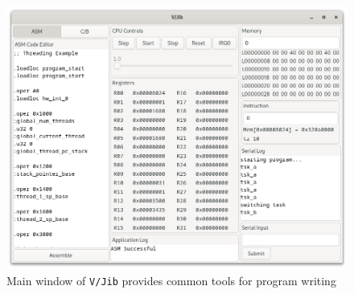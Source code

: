 \documentclass{article}
\begin{document}
\begin{figure}[h!]
    \centering
    \includegraphics[width=5in]{images/visual-jib.png}
    \caption{Main window of \texttt{V/Jib} provides common tools for program writing}
    \label{fig:visual-jib-main-page}
\end{figure}
\end{document}
